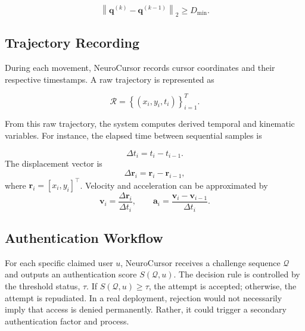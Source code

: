 \documentclass[conference]{IEEEtran}
\begin{document}
\begin{equation}
\left\|
\mathbf{q}^{(k)}-\mathbf{q}^{(k-1)}
\right\|_2
\geq
D_{\min}.
\label{eq:min_target_distance}
\end{equation}

\subsection{Trajectory Recording}

During each movement, NeuroCursor records cursor coordinates and their respective timestamps. A raw trajectory is represented as 

\begin{equation}
\mathcal{R}
=
\left\{
(x_i,y_i,t_i)
\right\}_{i=1}^{T}.
\label{eq:raw_trajectory}
\end{equation}

From this raw trajectory, the system computes derived temporal and kinematic variables. For instance, the elapsed time between sequential samples is 

\begin{equation}
\Delta t_i = t_i - t_{i-1}.
\label{eq:delta_t}
\end{equation}
The displacement vector is
\begin{equation}
\Delta \mathbf{r}_i
=
\mathbf{r}_i-\mathbf{r}_{i-1},
\label{eq:displacement}
\end{equation}
where $\mathbf{r}_i=[x_i,y_i]^{\top}$. Velocity and acceleration can be
approximated by
\begin{equation}
\mathbf{v}_i
=
\frac{\Delta \mathbf{r}_i}{\Delta t_i},
\qquad
\mathbf{a}_i
=
\frac{\mathbf{v}_i-\mathbf{v}_{i-1}}{\Delta t_i}.
\label{eq:discrete_velocity_acceleration}
\end{equation}

\subsection{Authentication Workflow}

For each specific claimed user $u$, NeuroCursor receives a challenge sequence $\mathcal{Q}$ and outputs an authentication score $S(\mathcal{Q},u)$. The decision rule is controlled by the threshold status, $\tau$. If $S(\mathcal{Q},u)\geq \tau$, the attempt is accepted; otherwise, the attempt is repudiated. In a real deployment, rejection would not necessarily imply that access is denied permanently. Rather, it could trigger a secondary authentication factor and process. 
\end{document}
